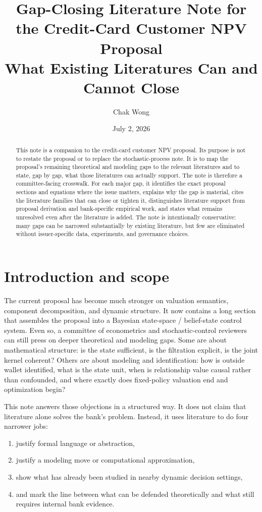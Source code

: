 \documentclass[11pt]{article}
\title{Gap-Closing Literature Note for the Credit-Card Customer NPV Proposal\\
What Existing Literatures Can and Cannot Close}
\author{Chak Wong}
\date{July 2, 2026}
\begin{document}
\maketitle

\begin{abstract}
This note is a companion to the credit-card customer NPV proposal. Its purpose
is not to restate the proposal or to replace the stochastic-process note. It is
to map the proposal's remaining theoretical and modeling gaps to the relevant
literatures and to state, gap by gap, what those literatures can actually
support. The note is therefore a committee-facing crosswalk. For each major gap,
it identifies the exact proposal sections and equations where the issue matters,
explains why the gap is material, cites the literature families that can close
or tighten it, distinguishes literature support from proposal derivation and
bank-specific empirical work, and states what remains unresolved even after the
literature is added. The note is intentionally conservative: many gaps can be
narrowed substantially by existing literature, but few are eliminated without
issuer-specific data, experiments, and governance choices.
\end{abstract}

\section{Introduction and scope}

The current proposal has become much stronger on valuation semantics,
component decomposition, and dynamic structure. It now contains a long section
that assembles the proposal into a Bayesian state-space / belief-state control
system. Even so, a committee of econometrics and stochastic-control reviewers
can still press on deeper theoretical and modeling gaps. Some are about
mathematical structure: is the state sufficient, is the filtration explicit, is
the joint kernel coherent? Others are about modeling and identification: how is
outside wallet identified, what is the state unit, when is relationship value
causal rather than confounded, and where exactly does fixed-policy valuation end
and optimization begin?

This note answers those objections in a structured way. It does not claim that
literature alone solves the bank's problem. Instead, it uses literature to do
four narrower jobs:
\begin{enumerate}[label=\arabic*.]
  \item justify formal language or abstraction,
  \item justify a modeling move or computational approximation,
  \item show what has already been studied in nearby dynamic decision settings,
  \item and mark the line between what can be defended theoretically and what
        still requires internal bank evidence.
\end{enumerate}
\end{document}
